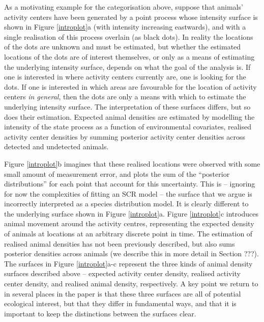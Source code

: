 \documentclass[a4paper,12pt]{article}
\begin{document}
As a motivating example for the categorisation above, suppose that animals' activity centers have been generated by a point process whose intensity surface is shown in Figure \ref{introplot}a (with intensity increasing eastwards), and with a single realisation of this process overlain (as black dots). In reality the locations of the dots are unknown and must be estimated, but whether the estimated locations of the dots are of interest themselves, or only as a means of estimating the underlying intensity surface, depends on what the goal of the analysis is. If one is interested in where activity centers currently are, one is looking for the dots. If one is interested in which areas are favourable for the location of activity centers {\it in general}, then the dots are only a means with which to estimate the underlying intensity surface. The interpretation of these surfaces differs, but so does their estimation. Expected animal densities are estimated by modelling the intensity of the state process as a function of environmental covariates, realised activity center densities by summing posterior activity center densities across detected and undetected animals.

Figure \ref{introplot}b imagines that these realised locations were observed with some small amount of measurement error, and plots the sum of the ``posterior distributions'' for each point that account for this uncertainty. This is -- ignoring for now the complexities of fitting an SCR model -- the surface that we argue is incorrectly interpreted as a species distribution model. It is clearly different to the underlying surface shown in Figure \ref{introplot}a. Figure \ref{introplot}c introduces animal movement around the activity centres, representing the expected density of animals at locations at an arbitrary discrete point in time. The estimation of realised animal densities has not been previously described, but also sums posterior densities across animals (we describe this in more detail in Section ???). The surfaces in Figure \ref{introplot}a-c represent the three kinds of animal density surfaces described above -- expected activity center density, realised activity center density, and realised animal density, respectively. A key point we return to in several places in the paper is that these three surfaces are all of potential ecological interest, but that they differ in fundamental ways, and that it is important to keep the distinctions between the surfaces clear.
\end{document}
